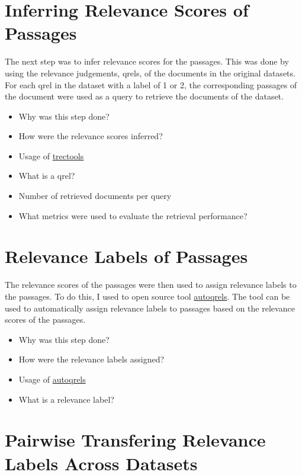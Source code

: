 \section{Inferring Relevance Scores of Passages}\label{inferring-relevance-scores-of-passages}

The next step was to infer relevance scores for the passages. This was done by using the relevance judgements, qrels, of the documents in the original datasets. For each qrel in the dataset with a label of 1 or 2, the corresponding passages of the document were used as a query to retrieve the documents of the dataset. 

\begin{itemize}
    \item Why was this step done?
    \item How were the relevance scores inferred?
    \item Usage of \href{https://github.com/joaopalotti/trectools}{trectools}
    \item What is a qrel?
    \item Number of retrieved documents per query
    \item What metrics were used to evaluate the retrieval performance?
\end{itemize}

\section{Relevance Labels of Passages}\label{relevance-labels-of-passages}

The relevance scores of the passages were then used to assign relevance labels to the passages. To do this, I used to open source tool \href{https://github.com/seanmacavaney/autoqrels}{autoqrels}. The tool can be used to automatically assign relevance labels to passages based on the relevance scores of the passages.

\begin{itemize}
    \item Why was this step done?
    \item How were the relevance labels assigned?
    \item Usage of \href{https://github.com/seanmacavaney/autoqrels}{autoqrels}
    \item What is a relevance label?
\end{itemize}


\section{Pairwise Transfering Relevance Labels Across Datasets}\label{pairwise-transfering-relevance-labels-across-datasets}

